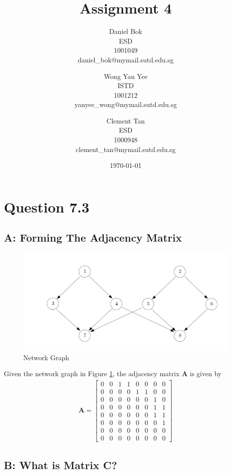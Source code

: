 \documentclass[]{article}
\title{Assignment 4}
\author{
	Daniel Bok \\
	ESD \\
	1001049 \\
	daniel\_bok@mymail.sutd.edu.sg 
	\and
	Wong Yan Yee\\ 
	ISTD \\
	1001212 \\
	yanyee\_wong@mymail.sutd.edu.sg
	\and
	Clement Tan \\
	ESD \\
	1000948 \\
	clement\_tan@mymail.sutd.edu.sg
}
\date{\today}
\begin{document}
	
\maketitle

\newpage
\section*{Question 7.3}

\subsection*{A: Forming The Adjacency Matrix}

\begin{figure}[H]
	\includegraphics[width=\linewidth]{7-16.png}
	\caption{Network Graph} 
	\label{Q7.3 Network Graph 1}
\end{figure}

Given the network graph in Figure \ref{Q7.3 Network Graph 1}, the adjacency matrix $\mathbf{A}$ is given by
\begin{gather*}
	\mathbf{A} = \begin{bmatrix}
		0 & 0 & 1 & 1 & 0 & 0 & 0 & 0 \\
		0 & 0 & 0 & 0 & 1 & 1 & 0 & 0 \\
		0 & 0 & 0 & 0 & 0 & 0 & 1 & 0 \\
		0 & 0 & 0 & 0 & 0 & 0 & 1 & 1 \\
		0 & 0 & 0 & 0 & 0 & 0 & 1 & 1 \\
		0 & 0 & 0 & 0 & 0 & 0 & 0 & 1 \\
		0 & 0 & 0 & 0 & 0 & 0 & 0 & 0 \\
		0 & 0 & 0 & 0 & 0 & 0 & 0 & 0
	\end{bmatrix}
\end{gather*}

\subsection*{B: What is Matrix C?}
\end{document}
